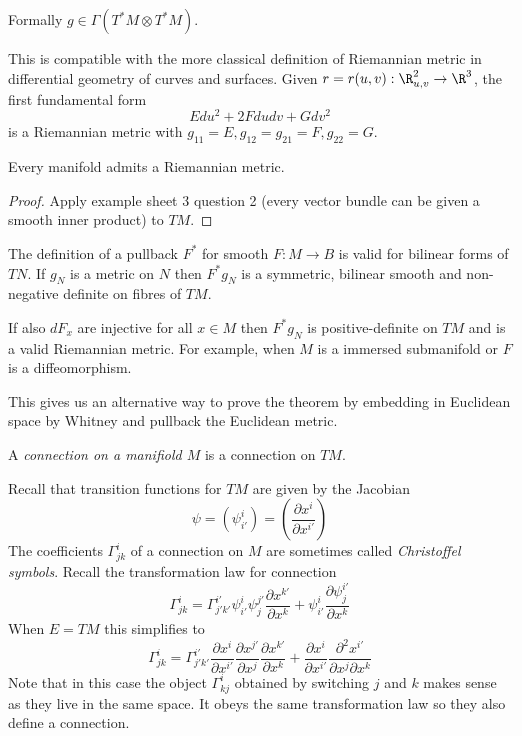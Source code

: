 \documentclass[a4paper]{article}
\begin{document}
Formally \(g \in \Gamma(T^*M \otimes T^*M)\).

\begin{eg}
  This is compatible with the more classical definition of Riemannian metric in differential geometry of curves and surfaces. Given \(r = r(u, v): \R^2_{u, v} \to \R^3\), the first fundamental form
  \[
    E du^2 + 2F dudv + G dv^2
  \]
  is a Riemannian metric with \(g_{11} = E, g_{12} = g_{21} = F, g_{22} = G\).
\end{eg}

\begin{theorem}
  Every manifold admits a Riemannian metric.
\end{theorem}

\begin{proof}
  Apply example sheet 3 question 2 (every vector bundle can be given a smooth inner product) to \(TM\).
\end{proof}

The definition of a pullback \(F^*\) for smooth \(F: M \to B\) is valid for bilinear forms of \(TN\). If \(g_N\) is a metric on \(N\) then \(F^*g_N\) is a symmetric, bilinear smooth and non-negative definite on fibres of \(TM\).

If also \(dF_x\) are injective for all \(x \in M\) then \(F^*g_N\) is positive-definite on \(TM\) and is a valid Riemannian metric. For example, when \(M\) is a immersed submanifold or \(F\) is a diffeomorphism.

This gives us an alternative way to prove the theorem by embedding in Euclidean space by Whitney and pullback the Euclidean metric.

\begin{definition}[connection]
  A \emph{connection on a manifiold \(M\)} is a connection on \(TM\).
\end{definition}

Recall that transition functions for \(TM\) are given by the Jacobian
\[
  \psi = (\psi^i_{i'}) = \left( \frac{\partial x^i}{\partial x^{i'}} \right)
\]
The coefficients \(\Gamma_{jk}^i\) of a connection on \(M\) are sometimes called \emph{Christoffel symbols}. Recall the transformation law for connection %
\[
  \Gamma^i_{jk} = \Gamma^{i'}_{j'k'} \psi^i_{i'} \psi^{j'}_j \frac{\partial x^{k'}}{\partial x^k} + \psi^i_{i'} \frac{\partial \psi^{i'}_j}{\partial x^k}
\]
When \(E = TM\) this simplifies to
\[
  \Gamma^i_{jk} = \Gamma^{i'}_{j'k'} \frac{\partial x^i}{\partial x^{i'}} \frac{\partial x^{j'}}{\partial x^j} \frac{\partial x^{k'}}{\partial x^k} + \frac{\partial x^i}{\partial x^{i'}} \frac{\partial^2 x^{i'}}{\partial x^j \partial x^k}
\]
Note that in this case the object \(\Gamma^i_{kj}\) obtained by switching \(j\) and \(k\) makes sense as they live in the same space. It obeys the same transformation law so they also define a connection.
\end{document}
